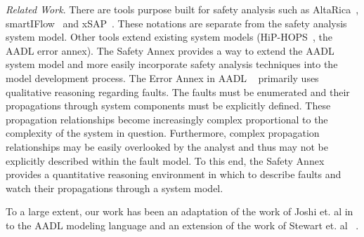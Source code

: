 \textit{Related Work}.
There are tools purpose built for safety analysis such as AltaRica~\cite{PROSVIRNOVA2013127}, smartIFlow~\cite{info8010007} and xSAP~\cite{DBLP:conf/tacas/BittnerBCCGGMMZ16}. These notations are separate from the safety analysis system model. Other tools extend existing system models (HiP-HOPS~\cite{CHEN201391}, the AADL error annex\cite{SAEAS}). The Safety Annex provides a way to extend the AADL system model and more easily incorporate safety analysis techniques into the model development process. The Error Annex in AADL ~\cite{Larson:2013:IAE:2527269.2527271} primarily uses qualitative reasoning regarding faults. The faults must be enumerated and their propagations through system components must be explicitly defined. These propagation relationships become increasingly complex proportional to the complexity of the system in question. Furthermore, complex propagation relationships may be easily overlooked by the analyst and thus may not be explicitly described within the fault model. To this end, the Safety Annex provides a quantitative reasoning environment in which to describe faults and watch their propagations through a system model. 

To a large extent, our work has been an adaptation of the work of Joshi et. al in \cite {Joshi05:Dasc,Joshi05:SafeComp,NasaRep:MBSA-Aug05} to the AADL modeling language and an extension of the work of Stewart et. al ~\cite{Stewart17:IMBSA}.





